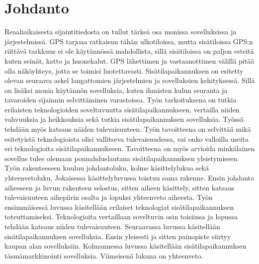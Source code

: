 \section{Johdanto}

Reaaliaikaisesta sijaintitiedosta on tullut tärkeä osa monissa sovelluksissa ja järjestelmissä\cite{D}. GPS tarjoaa ratkaisun tähän ulkotiloissa, mutta sisätiloissa GPS:n riittävä tarkkuus ei ole käytännössä mahdollista, sillä sisätiloissa on paljon esteitä kuten seinät, katto ja huonekalut. GPS lähettimen ja vastaanottimen välillä pitää olla näköyhteys, jotta se toimisi luotettavasti.\cite{D,B}
Sisätilapaikannuksen on esitetty olevan seuraava askel langattomien järjestelmien ja sovelluksien kehityksessä\cite{C}. Sillä on lisäksi monia käytännön sovelluksia, kuten ihmisten kulun seuranta ja tavaroiden sijainnin selvittäminen varastoissa\cite{A}. 
Työn tarkoituksena on tutkia erilaisten teknologioiden soveltuvuutta sisätilapaikannukseen, vertailla niiden vahvuuksia ja heikkouksia sekä tutkia sisätilapaikannuksen sovelluksia. Työssä tehdään myös katsaus näiden tulevaisuuteen.
Työn tavoitteena on selvittää mikä esitetyistä teknologioista olisi vallitseva tulevaisuudessa, vai onko valloilla useita eri teknologioita sisätilapaikannukseen. Tavoitteena on myös arvioida minkälainen sovellus tulee olemaan ponnahduslautana sisätilapaikannuksen yleistymiseen.
Työn rakenteeseen kuuluu johdantoluku, kolme käsittelylukua sekä yhteenvetoluku. Jokaisessa käsittelyluvussa toistuu sama rakenne. Ensin johdanto aiheeseen ja luvun rakenteen selostus, sitten aiheen käsittely, sitten katsaus tulevaisuuteen aihepiirin osalta ja lopuksi yhteenveto aiheesta.  
Työn ensimmäisessä luvussa käsitellään erilaiset teknologiat sisätilapaikannuksen toteuttamiseksi. Teknologioita vertaillaan soveltuvin osin toisiinsa ja lopussa tehdään katsaus niiden tulevaisuuteen. Seuraavassa luvussa käsitellään sisätilapaikannuksen sovelluksia. Ensin yleisesti ja sitten painopiste siirtyy kaupan alan sovelluksiin. Kolmannessa luvussa käsitellään sisätilapaikannuksen täsmämarkkinointi sovelluksia. Viimeisenä lukuna on yhteenveto.
